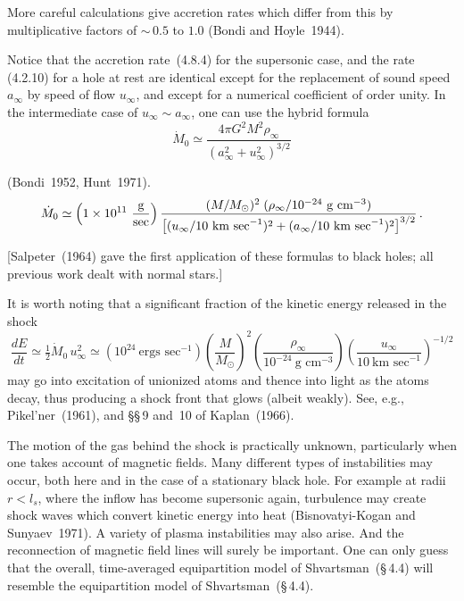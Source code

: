 More careful calculations give accretion rates which differ from this by
multiplicative factors of ${\sim}\,0.5$ to $1.0$ (Bondi and Hoyle~1944)\cite{BondiHoyle1944}.

Notice that the accretion rate~(4.8.4) for the supersonic case, and the rate
(4.2.10) for a hole at rest are identical except for the replacement of sound
speed $a_\infty$ by speed of flow $u_\infty$, and except for a numerical coefficient of order
unity. In the intermediate case of $u_\infty \sim a_\infty$, one can use the hybrid formula
\begin{equation}
\dot{M}_0 \simeq \frac{4\pi G^2 M^2 \rho_\infty}{(a_\infty^2 + u_\infty^2)^{3/2}}
\tag{4.8.5}
\end{equation}

(Bondi~1952, Hunt~1971)\cite{Bondi1952,Hunt1971}.
\begin{equation}
\dot{M}_0 \simeq \left(1 \times 10^{11}~\frac{\text{g}}{\text{sec}}\right)
\frac{(M/M_\odot)^2\;(\rho_\infty/10^{-24}~\text{g~cm}^{-3})}
{\bigl[(u_\infty/10~\text{km~sec}^{-1})^2 + (a_\infty/10~\text{km~sec}^{-1})^2\bigr]^{3/2}}\,.
\notag
\end{equation}

[Salpeter~(1964)\cite{Salpeter1964} gave the first application of these formulas to black holes; all
previous work dealt with normal stars.]

It is worth noting that a significant fraction of the kinetic energy released in
the shock
\begin{equation}
\frac{dE}{dt} \simeq \tfrac{1}{2}\dot{M}_0\, u_\infty^2
\simeq \left(10^{24}~\text{ergs~sec}^{-1}\right)
\left(\frac{M}{M_\odot}\right)^{\!2}
\left(\frac{\rho_\infty}{10^{-24}~\text{g~cm}^{-3}}\right)
\left(\frac{u_\infty}{10~\text{km~sec}^{-1}}\right)^{-1/2}
\tag{4.8.6}
\end{equation}
may go into excitation of unionized atoms and thence into light as the atoms
decay, thus producing a shock front that glows (albeit weakly). See, e.g.,
Pikel'ner~(1961), and \S\S\,9 and~10 of Kaplan~(1966)\cite{Pikelner1961,Kaplan1966}.

The motion of the gas behind the shock is practically unknown, particularly
when one takes account of magnetic fields. Many different types of instabilities
may occur, both here and in the case of a stationary black hole. For example at
radii $r < l_s$, where the inflow has become supersonic again, turbulence may
create shock waves which convert kinetic energy into heat (Bisnovatyi-Kogan and
Sunyaev~1971)\cite{BisnovatyiKoganSunyaev1971}. A variety of plasma instabilities may also arise. And the
reconnection of magnetic field lines will surely be important. One can only guess that
the overall, time-averaged equipartition model of
Shvartsman~(\S\,4.4)\cite{Shvartsman1971} will resemble the equipartition model of
Shvartsman~(\S\,4.4).


